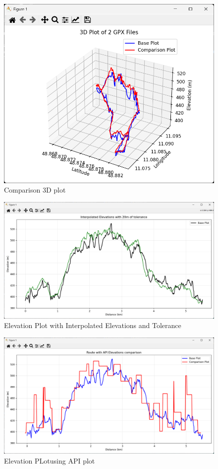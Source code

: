 \documentclass[12pt]{article}
\begin{document}
\begin{figure}[h!]
    \centering
    \includegraphics[width=\textwidth]{Project_Screenshots/3d plot.png}
    \caption{Comparison 3D plot	}
\end{figure}

\begin{figure}[h!]
    \centering
    \includegraphics[width=\textwidth]{Project_Screenshots/4ElevationPlotwInterpolatedElevationsandTolerance.png}
    \caption{Elevation Plot with Interpolated Elevations and Tolerance}
\end{figure}

\begin{figure}[h!]
    \centering
    \includegraphics[width=\textwidth]{Project_Screenshots/5ElevationPLotusingAPIplot.png}
    \caption{Elevation PLotusing API plot}
\end{figure}
\end{document}
